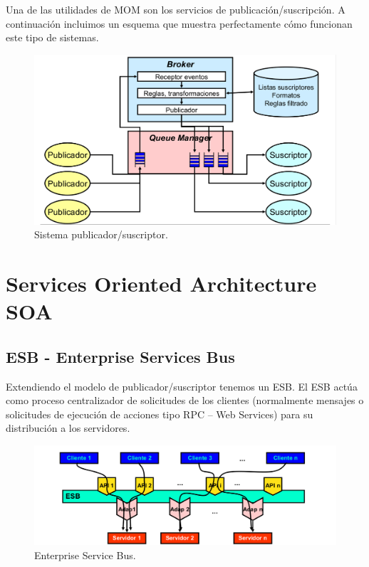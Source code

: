 \begin{example}
Una de las utilidades de MOM son los servicios de publicación/suscripción. A continuación incluimos un esquema que muestra perfectamente cómo funcionan este tipo de sistemas.


\begin{figure}[hbtp]
\centering
\includegraphics[width=1\textwidth]{img/PubSusc.png}
\caption{Sistema publicador/suscriptor.}
\label{PubSusc}
\end{figure}
\newpage
\end{example}


\section{Services Oriented Architecture SOA}
\subsection{ESB - Enterprise Services Bus}

Extendiendo el modelo de publicador/suscriptor tenemos un ESB. El ESB actúa como proceso centralizador de solicitudes de los clientes (normalmente mensajes o solicitudes de ejecución de acciones tipo RPC – Web Services) para su distribución a los servidores.


\begin{figure}[hbtp]
\centering
\includegraphics[width=1\textwidth]{img/ESB.png}
\caption{Enterprise Service Bus.}
\label{ESB}
\end{figure}

